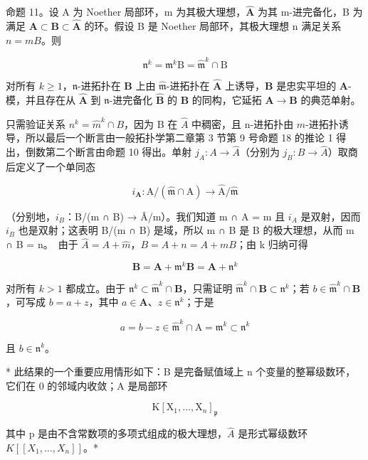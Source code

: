 命题 11。设 A 为 Noether 局部环，m 为其极大理想，\(\hat{\mathbf{A}}\) 为其 m-进完备化，B 为满足 \(\mathbf{A} \subset \mathbf{B} \subset \hat{\mathbf{A}}\) 的环。假设 B 是 Noether 局部环，其极大理想 n 满足关系 \(n = mB\)。则

\[
\mathfrak {n} ^ {k} = \mathfrak {m} ^ {k} \mathrm{B} = \hat {\mathfrak {m}} ^ {k} \cap \mathrm{B}
\]

对所有 \(k \geqslant 1\)，\(\mathfrak{n}\)-进拓扑在 \(\mathbf{B}\) 上由 \(\hat{\mathfrak{m}}\)-进拓扑在 \(\hat{\mathbf{A}}\) 上诱导，\(\mathbf{B}\) 是忠实平坦的 \(\mathbf{A}\)-模，并且存在从 \(\hat{\mathbf{A}}\) 到 \(\mathfrak{n}\)-进完备化 \(\hat{\mathbf{B}}\) 的 \(\mathbf{B}\) 的同构，它延拓 \(\mathbf{A} \to \mathbf{B}\) 的典范单射。

只需验证关系 \(n^{k} = \hat{m}^{k} \cap B\)，因为 B 在 \(\hat{A}\) 中稠密，且 n-进拓扑由 \(\hat{m}\)-进拓扑诱导，所以最后一个断言由一般拓扑学第二章第 3 节第 9 号命题 18 的推论 1 得出，倒数第二个断言由命题 10 得出。单射 \(j_{A}: A \to \hat{A}\)（分别为 \(j_{B}: B \to \hat{A}\)）取商后定义了一个单同态

\[
i _ {\mathbf {A}} \colon \mathrm{A} / (\hat {\mathfrak {m}} \cap \mathrm{A}) \rightarrow \hat {\mathrm{A}} / \hat {\mathfrak {m}}
\]

（分别地，\(i_{B}\)：B/(m ∩ B) → Â/m）。我们知道 m ∩ A = m 且 \(i_{A}\) 是双射，因而 \(i_{B}\) 也是双射；这表明 B/(m ∩ B) 是域，所以 m ∩ B 是 B 的极大理想，从而 m ∩ B = n。~由于 \(\hat{A} = A + \hat{m}\)，\(B = A + n = A + mB\)；由 k 归纳可得

\[
\mathbf {B} = \mathbf {A} + \mathfrak {m} ^ {k} \mathbf {B} = \mathbf {A} + \mathfrak {n} ^ {k}
\]

对所有 \(k > 1\) 都成立。由于 \(\mathfrak{n}^k \subset \hat{\mathfrak{m}}^k \cap \mathbf{B}\)，只需证明 \(\hat{\mathfrak{m}}^k \cap \mathbf{B} \subset \mathfrak{n}^k\)；若 \(b \in \hat{\mathfrak{m}}^k \cap \mathbf{B}\)，可写成 \(b = a + z\)，其中 \(a \in \mathbf{A}\)、\(z \in \mathfrak{n}^k\)；于是

\[
a = b - z \in \hat {\mathfrak {m}} ^ {k} \cap \mathrm{A} = \mathfrak {m} ^ {k} \subset \mathfrak {n} ^ {k}
\]

且 \(b \in \mathfrak{n}^k\)。

* 此结果的一个重要应用情形如下：B 是完备赋值域上 n 个变量的整幂级数环，它们在 0 的邻域内收敛；A 是局部环

\[
\mathrm{K} [ \mathrm{X} _ {1}, \dots , \mathrm{X} _ {n} ] _ {\mathfrak {p}}
\]

其中 p 是由不含常数项的多项式组成的极大理想，\(\hat{A}\) 是形式幂级数环 \(K[[X_{1},\ldots,X_{n}]]\)。*

